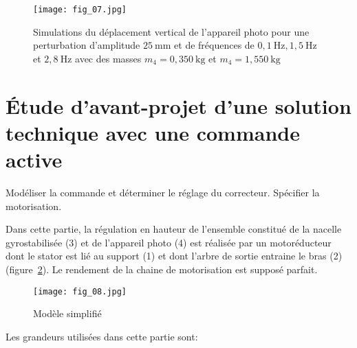 \begin{figure}[H]
\centering
\texttt{[image: fig\_07.jpg]}
\caption{\label{fig:07} Simulations du déplacement vertical de l'appareil photo pour une perturbation d'amplitude $25 \mathrm{~mm}$ et de fréquences de $0,1 \mathrm{~Hz}, 1,5 \mathrm{~Hz}$ et $2,8 \mathrm{~Hz}$ avec des masses $m_{4}=0,350 \mathrm{~kg}$ et $m_{4}=1,550 \mathrm{~kg}$
}
\end{figure}
\fi


\section{\label{part:4} Étude d'avant-projet d'une solution technique avec une commande active }

\begin{obj}
Modéliser la commande et déterminer le réglage du correcteur. Spécifier la motorisation.
\end{obj}

\ifprof
\else
Dans cette partie, la régulation en hauteur de l'ensemble constitué de la nacelle gyrostabilisée (3) et de l'appareil photo (4) est réalisée par un motoréducteur dont le stator est lié au support (1) et dont l'arbre de sortie entraine le bras (2) (figure~\ref{fig:08}). Le rendement de la chaine de motorisation est supposé parfait.

\begin{figure}[H]
\centering
\texttt{[image: fig\_08.jpg]}
\caption{\label{fig:08} Modèle simplifié}
\end{figure}

 Les grandeurs utilisées dans cette partie sont:

